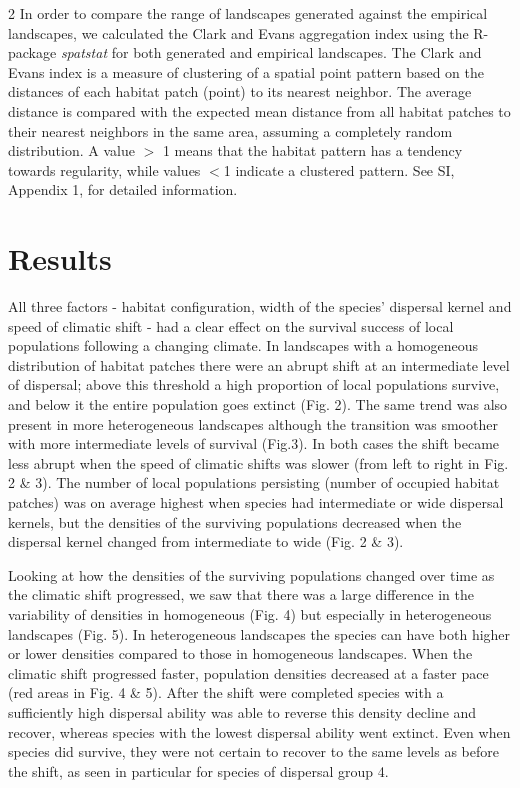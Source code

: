 \documentclass[12pt,pdftex]{article}
\begin{document}
\begin{spacing}{2}
In order to compare the range of landscapes generated against the empirical landscapes, we calculated the Clark and Evans aggregation index \citep{Clark1954} using the R-package {\em spatstat} for both generated and empirical landscapes. The Clark and Evans index is a measure of clustering of a spatial point pattern based on the distances of each habitat patch (point) to its nearest neighbor. The average distance is compared with the expected mean distance from all habitat patches to their nearest neighbors in the same area, assuming a completely random distribution. A value $>$ 1 means that the habitat pattern has a tendency towards regularity, while values $<$1 indicate a clustered pattern.  See SI, Appendix 1, for detailed information.


\section*{Results}
All three factors - habitat configuration, width of the species’ dispersal kernel and speed of climatic shift - had a clear effect on the survival success of local populations following a changing climate. In landscapes with a homogeneous distribution of habitat patches there were an abrupt shift at an intermediate level of dispersal; above this threshold a high proportion of local populations survive, and below it the entire population goes extinct (Fig. 2). The same trend was also present in more heterogeneous landscapes although the transition was smoother with more intermediate levels of survival (Fig.3). In both cases the shift became less abrupt when the speed of climatic shifts was slower (from left to right in Fig. 2 \& 3). The number of local populations persisting (number of occupied habitat patches) was on average highest when species had intermediate or wide dispersal kernels, but the densities of the surviving populations decreased when the dispersal kernel changed from intermediate to wide (Fig. 2 \& 3). 


Looking at how the densities of the surviving populations changed over time as the climatic shift progressed, we saw that there was a large difference in the variability of densities in homogeneous (Fig. 4) but especially in heterogeneous landscapes (Fig. 5). In heterogeneous  landscapes the species can have both higher or lower densities compared to those in homogeneous landscapes. When the climatic shift progressed faster, population densities decreased at a faster pace (red areas in Fig. 4 \& 5). After the shift were completed species with a sufficiently high dispersal ability was able to reverse this density decline and recover, whereas species with the lowest dispersal ability went extinct. Even when species did survive, they were not certain to recover to the same levels as before the shift, as seen in particular for species of dispersal group 4. 



\end{spacing}
\end{document}
